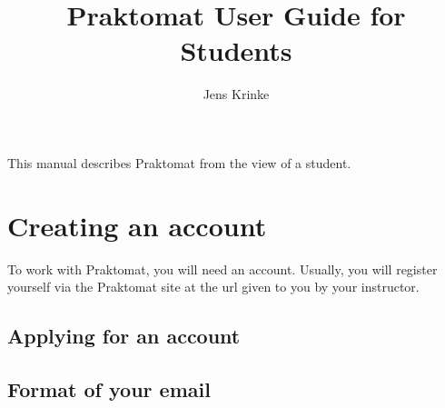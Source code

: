 \documentclass{article}
\begin{document}
\title{Praktomat User Guide for Students}
\author{Jens Krinke}
\maketitle

This manual describes Praktomat from the view of a student.

\tableofcontents



\section{Creating an account}

To work with Praktomat, you will need an account. Usually, you will register yourself via the Praktomat site at the url given to you by your instructor.

\subsection{Applying for an account}

\subsection{Format of your email}
\end{document}
